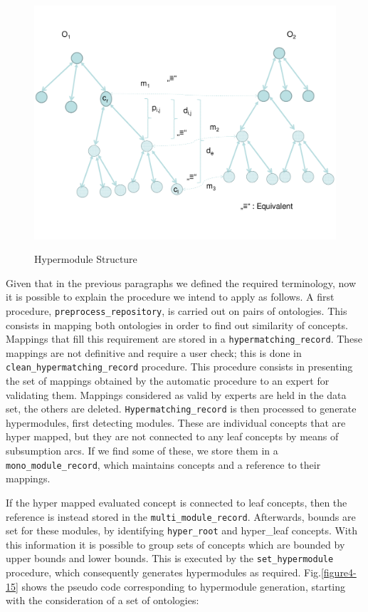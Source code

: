 \begin{figure}
\begin{center}
	\includegraphics[scale=0.7, angle = 90]{figure-chapterIV/fig4-14.pdf}\\
	\caption{Hypermodule Structure}
	\label{figure4-14}
\end{center}
\end{figure}

Given that in the previous paragraphs we defined the required terminology, now it is possible to explain the procedure we intend to apply as follows. A first procedure, \texttt{preprocess\_repository}, is carried out on pairs of ontologies. This consists in  mapping both ontologies in order to find out similarity of concepts. Mappings that fill this requirement are stored in a \texttt{hypermatching\_record}. These mappings are not definitive and require a user check; this is done in \texttt{clean\_hypermatching\_record} procedure. This procedure consists in presenting the set of mappings obtained by the automatic procedure to an expert for validating them. Mappings considered as valid by experts are held in the data set, the others are deleted. \texttt{Hypermatching\_record} is then processed to generate hypermodules, first detecting modules. These are individual concepts that are hyper mapped, but they are not connected to any leaf concepts by means of subsumption arcs. If we find some of these, we store them in a \texttt{mono\_module\_record}, which maintains concepts and a reference to their mappings. 

If the hyper mapped evaluated concept is connected to leaf concepts, then the reference is instead stored in the \texttt{multi\_module\_record}. Afterwards, bounds are set for these modules, by identifying \texttt{hyper\_root} and {hyper\_leaf} concepts. With this information it is possible to group sets of concepts which are bounded by upper bounds and lower bounds. This is executed by the \texttt{set\_hypermodule} procedure, which consequently generates hypermodules as required. Fig.\ref{figure4-15} shows the pseudo code corresponding to hypermodule generation, starting with the consideration of a set of ontologies:

